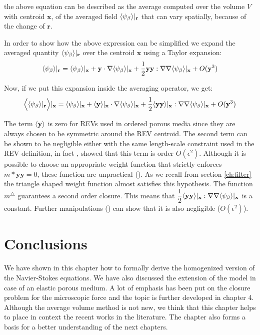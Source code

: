 \noindent the above equation can be described as the average computed over the volume $V$ with centroid $\mathbf{x}$, of the averaged field ${\left< \psi_{\beta} \right>}|_{\mathbf{r}}$ that can vary spatially, because of the change of $\mathbf{r}$.

In order to show how the above expression can be simplified we expand the averaged quantity ${\left< \psi_{\beta} \right>}|_{\mathbf{r}}$ over the centroid $\mathbf{x}$ using a Taylor expansion:
$$
{\left< \psi_{\beta} \right>}|_{\mathbf{r}} = {\left< \psi_{\beta} \right>}|_{\mathbf{x}} + \mathbf{y} \cdot \nabla {\left< \psi_{\beta} \right>}|_{\mathbf{x}} + \dfrac{1}{2} \mathbf{y}\mathbf{y} :  \nabla \nabla {\left< \psi_{\beta} \right>}|_{\mathbf{x}} + O(\mathbf{y}^3)
$$

Now, if we put this expansion inside the averaging operator, we get:
$$
\Big< {\left< \psi_{\beta} \right>}|_{\mathbf{r}} \Big>|_{\mathbf{x}} = {\left< \psi_{\beta} \right>}|_{\mathbf{x}} + {\left< \mathbf{y} \right>}|_{\mathbf{x}} \cdot \nabla {\left< \psi_{\beta} \right>}|_{\mathbf{x}} + \dfrac{1}{2} {\left< \mathbf{y}\mathbf{y} \right>}|_{\mathbf{x}} :  \nabla \nabla {\left< \psi_{\beta} \right>}|_{\mathbf{x}} + O(\mathbf{y}^3)
$$

The term ${\left< \mathbf{y} \right>}$ is zero for REVs used in ordered porous media since they are always chosen to be symmetric around the REV centroid.
The second term can be shown to be negligible either with the same length-scale constraint used in the REV definition, in fact \citet{ochoa1995momentum}, \citet{paez2017macroscopic} showed that this term is order $O(\epsilon^2)$.
Although it is possible to choose an appropriate weight function that strictly enforces $m*\mathbf{y}\mathbf{y} =0$, these function are unpractical (\citet{davit2017technical}).
As we recall from section \ref{ch:filter} the triangle shaped weight function almost satisfies this hypothesis. The function $m^{\triangle}$ guarantees a second order closure. This means that $\dfrac{1}{2} {\left< \mathbf{y}\mathbf{y} \right>}|_{\mathbf{x}} :  \nabla \nabla {\left< \psi_{\beta} \right>}|_{\mathbf{x}}$ is a constant. Further manipulations (\cite{davit2017technical}) can show that it is also negligible ($O(\epsilon^2)$).

\section{Conclusions}
We have shown in this chapter how to formally derive the homogenized version of the Navier-Stokes equations. We have also discussed the extension of the model in case of an elastic porous medium. A lot of emphasis has been put on the closure problem for the microscopic force and the topic is further developed in chapter 4.
Although the average volume method is not new, we think that this chapter helps to place in context the recent works in the literature. The chapter also forms a basis for a better understanding of the next chapters.

